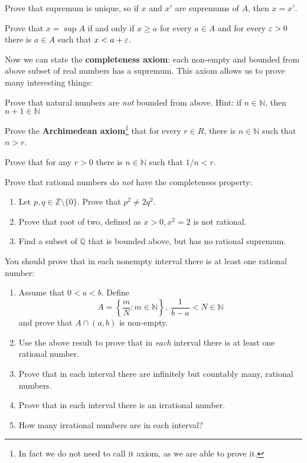 \begin{prob}
  Prove that supremum is unique, so if $x$ and $x'$ are supremums
  of $A$, then $x=x'$.
\end{prob}

\begin{prob}
  Prove that $x=\sup A$ if and only if
  $x\ge a$ for every $a\in A$ and for every $\varepsilon > 0$ there is
  $a\in A$ such that $x < a + \varepsilon$.
\end{prob}

\noindent Now we can state the \textbf{completeness axiom}:
each non-empty and bounded from above subset of real numbers has
a supremum.
This axiom allows us to prove many interesting things:

\begin{prob}
  Prove that natural numbers are \textit{not} bounded from above.
  Hint: if $n\in \mathbb N$, then $n+1\in \mathbb N$
\end{prob}

\begin{prob}
  Prove the \textbf{Archimedean axiom}\footnote{In fact we do not
  need to call it axiom, as we are able to prove it.}
  that for every $r\in R$, there is $n\in \mathbb N$ such that $n>r$.
\end{prob}

\begin{prob}
  Prove that for any $r>0$ there is $n\in \mathbb N$ such that
  $1/n < r$.
\end{prob}

\begin{prob}
  Prove that rational numbers do \textit{not} have the completeness
  property:
  \begin{enumerate}
    \item Let $p, q\in \mathbb Z\setminus \{0\}$.
      Prove that $p^2\neq 2q^2$.
    \item Prove that root of two, defined as
      $x > 0, x^2=2$ is not rational.
    \item Find a subset of $\mathbb Q$ that is bounded above, but
      has no rational supremum.
  \end{enumerate}
\end{prob}

\begin{prob}
  You should prove that in each nonempty interval there is at least
  one rational number:
  \begin{enumerate}
    \item Assume that $0<a<b$. Define
      $$A=\left\{\frac m N : m\in \mathbb N\right\},~
      \frac 1{b-a} < N \in \mathbb N$$
      and prove that $A\cap (a,b)$ is non-empty.
    \item Use the above result to prove that in \textit{each}
      interval there is at least one rational number.
    \item Prove that in each interval there are infinitely but countably many, rational numbers.
    \item Prove that in each interval there is an irrational number.
    \item How many irrational numbers are in each interval?
  \end{enumerate}
\end{prob}

